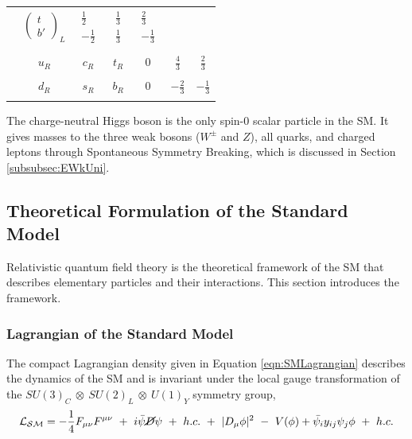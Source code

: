\begin{table}
\begin{center}
\begin{tabular}{| c | c | c | c | c | c | c |}
                     &$\begin{pmatrix}  t \\ b{'} \end{pmatrix}_{L}$  
                    &$\begin{matrix} \frac{1}{2} \\[0.15cm] -\frac{1}{2} \end{matrix}$
                    &$\begin{matrix} \frac{1}{3} \\[0.15cm] \frac{1}{3} \end{matrix}$
                    &$\begin{matrix} \frac{2}{3} \\[0.15cm] -\frac{1}{3} \end{matrix}$\\
                & & & & & & \\
                    & $u_{R}$ & $c_{R}$ &  $t_{R}$ & $0$ & $\frac{4}{3}$  & $\frac{2}{3}$ \\
                    & & & & & & \\
                    & $d_{R}$ & $s_{R}$ &  $b_{R}$ & $0$ & $-\frac{2}{3}$  & $-\frac{1}{3}$ \\
& & & & & & \\
\hline
\end{tabular}
\label{tab:Fermions}
\end{center}
\end{table}

The charge-neutral Higgs boson is the only spin-0 scalar particle in the SM. It gives masses to the three weak bosons ($W^{\pm}$ and $Z$), all quarks, and charged leptons through Spontaneous Symmetry Breaking, which is discussed in Section \ref{subsubsec:EWkUni}.

\subsection{Theoretical Formulation of the Standard Model}
\label{subsec:TheoryFormulation}

Relativistic quantum field theory is the theoretical framework of the SM that describes elementary particles and their interactions. This section introduces the framework. 

\subsubsection{Lagrangian of the Standard Model}
\label{subsubsec:SMLag}
The compact Lagrangian density given in Equation \ref{eqn:SMLagrangian} describes the dynamics of the SM and is invariant under the local gauge transformation of the $SU(3)_{C}~\otimes~SU(2)_{L}~\otimes~U(1)_{Y}$ symmetry group, 
\begin{equation}
\mathcal{L_{SM}} = -\frac{1}{4}F_{\mu\nu}F^{\mu\nu} ~+~ i\bar{\psi} \cancel{D} \psi ~+~ h.c. ~+~ |D_{\mu}\phi|^{2} ~-~V(\phi) + \bar{\psi_{i}}y_{ij}\psi_{j}\phi ~+~ h.c.
\label{eqn:SMLagrangian}
\end{equation}

